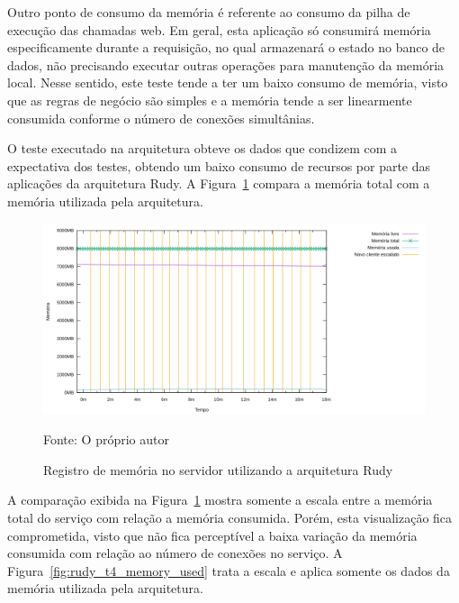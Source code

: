 Outro ponto de consumo da memória é referente ao consumo da pilha de execução das chamadas web. Em geral, esta aplicação só consumirá memória especificamente durante a requisição, no qual armazenará o estado no banco de dados, não precisando executar outras operações para manutenção da memória local.
%
Nesse sentido, este teste tende a ter um baixo consumo de memória, visto que as regras de negócio são simples e a memória tende a ser linearmente consumida conforme o número de conexões simultânias.

O teste executado na arquitetura obteve os dados que condizem com a expectativa dos testes, obtendo um baixo consumo de recursos por parte das aplicações da arquitetura Rudy.
%
A Figura~\ref{fig:rudy_t4_memory} compara a memória total com a memória utilizada pela arquitetura.

\begin{figure}[htb!]
    \caption{Registro de memória no servidor utilizando a arquitetura Rudy}
    \label{fig:rudy_t4_memory}
    \includegraphics[width=\textwidth]{metricas_rudy_t4/memory.png}
    \centering
    
    Fonte: O próprio autor
\end{figure}

A comparação exibida na Figura~\ref{fig:rudy_t4_memory} mostra somente a escala entre a memória total do serviço com relação a memória consumida.
%
Porém, esta visualização fica comprometida, visto que não fica perceptível a baixa variação da memória consumida com relação ao número de conexões no serviço.
%
A Figura~\ref{fig:rudy_t4_memory_used} trata a escala e aplica somente os dados da memória utilizada pela arquitetura.

